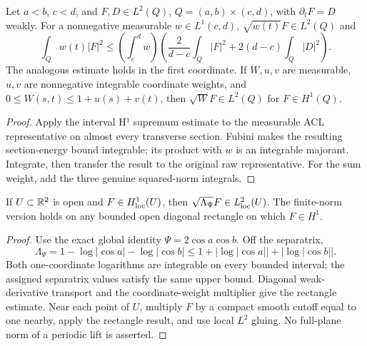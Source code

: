 \begin{lemma}
\label{lem:coordinate-weight-multiplier}
\leanok
Let $a<b$, $c<d$, and $F,D\in L^2(Q)$, $Q=(a,b)\times(c,d)$,
with $\partial_tF=D$ weakly. For a nonnegative measurable
$w\in L^1(c,d)$, $\sqrt{w(t)}F\in L^2(Q)$ and
\[
 \int_Qw(t)|F|^2\le\left(\int_c^d w\right)
 \left(\frac{2}{d-c}\int_Q|F|^2+2(d-c)\int_Q|D|^2\right).
\]
The analogous estimate holds in the first coordinate.
If $W,u,v$ are measurable, $u,v$ are nonnegative integrable coordinate
weights, and $0\le W(s,t)\le1+u(s)+v(t)$, then
$\sqrt W F\in L^2(Q)$ for $F\in H^1(Q)$.
\end{lemma}

\begin{proof}
\leanok
Apply the interval H¹ supremum estimate to the measurable ACL representative
on almost every transverse section. Fubini makes the resulting section-energy
bound integrable; its product with $w$ is an integrable majorant.
Integrate, then transfer the result to the original raw representative.
For the sum weight, add the three genuine squared-norm integrals.
\end{proof}

\begin{lemma}
\label{lem:dipole-log-multiplier}
\leanok
If $U\subset\mathbb{R}^2$ is open and $F\in H^1_{\rm loc}(U)$, then
$\sqrt{\Lambda_\Psi}F\in L^2_{\rm loc}(U)$.
The finite-norm version holds on any bounded open diagonal rectangle
on which $F\in H^1$.
\end{lemma}

\begin{proof}
\leanok
Use the exact global identity $\Psi=2\cos a\cos b$. Off the separatrix,
\[
 \Lambda_\Psi=1-\log|\cos a|-\log|\cos b|
 \le1+|\log|\cos a||+|\log|\cos b|| .
\]
Both one-coordinate logarithms are integrable on every bounded interval;
the assigned separatrix values satisfy the same upper bound.
Diagonal weak-derivative transport and the coordinate-weight multiplier
give the rectangle estimate. Near each point of $U$, multiply $F$ by a
compact smooth cutoff equal to one nearby, apply the rectangle result,
and use local $L^2$ gluing. No full-plane norm of a periodic lift is asserted.
\end{proof}

